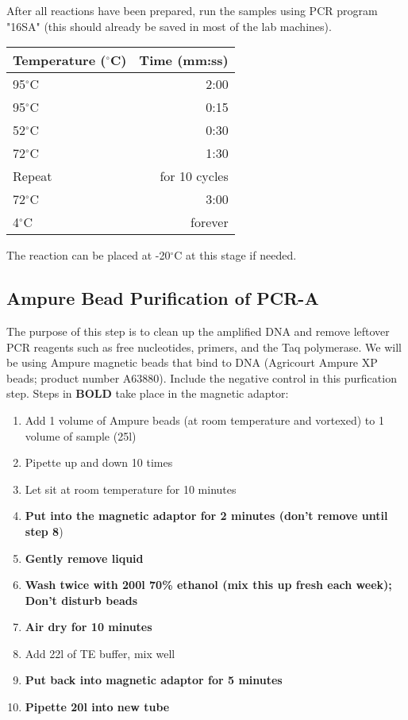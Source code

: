 \documentclass[letterpaper]{article}
\begin{document}
After all reactions have been prepared, run the samples using PCR program "16SA" (this should already be saved in most of the lab machines).

\begin{table}[H]
\centering
\begin{tabular}{l|r}
Temperature ($^{\circ}$C) & Time (mm:ss) \\\hline
95$^{\circ}$C  & 2:00 \\
\hline
95$^{\circ}$C & 0:15 \\
52$^{\circ}$C & 0:30 \\
72$^{\circ}$C & 1:30 \\
Repeat & for 10 cycles \\
\hline
72$^{\circ}$C &3:00 \\
4$^{\circ}$C & forever
\end{tabular}
\end{table}

The reaction can be placed at -20$^{\circ}$C at this stage if needed.


\subsection{Ampure Bead Purification of PCR-A}

The purpose of this step is to clean up the amplified DNA and remove leftover PCR reagents such as free nucleotides, primers, and the Taq polymerase. We will be using Ampure magnetic beads that bind to DNA (Agricourt Ampure XP beads; product number A63880). Include the negative control in this purfication step. Steps in \textbf{BOLD} take place in the magnetic adaptor:

\begin{enumerate}
\item Add 1 volume of Ampure beads (at room temperature and vortexed) to 1 volume of sample (25\unit{}{\micro}l)
\item Pipette up and down 10 times
\item Let sit at room temperature for 10 minutes
\item \textbf{Put into the magnetic adaptor for 2 minutes (don't remove until step 8})
\item \textbf{Gently remove liquid}
\item \textbf{Wash twice with 200\unit{}{\micro}l 70\% ethanol (mix this up fresh each week); Don't disturb beads}
\item \textbf{Air dry for 10 minutes}
\item Add 22\unit{}{\micro}l of TE buffer, mix well 
\item \textbf{Put back into magnetic adaptor for 5 minutes}
\item \textbf{Pipette 20\unit{}{\micro}l into new tube}
\end{enumerate}
\end{document}
